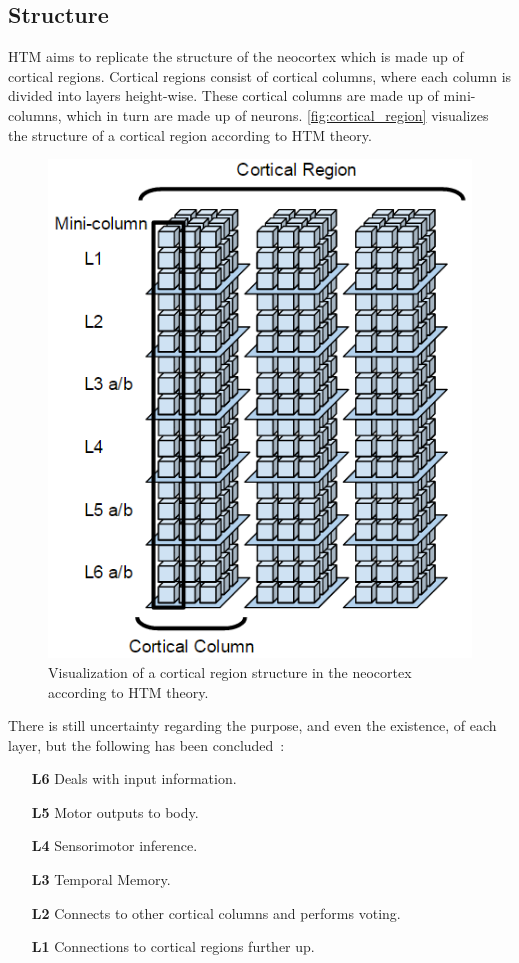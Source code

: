 \subsection{Structure}
\label{sec:htm_structure}
HTM aims to replicate the structure of the neocortex which is made up of cortical regions. Cortical regions consist of cortical columns, where each column is divided into layers height-wise. These cortical columns are made up of mini-columns, which in turn are made up of neurons. \autoref{fig:cortical_region} visualizes the structure of a cortical region according to HTM theory.
\begin{figure}[H]
    \centering
    \includegraphics[width=\textwidth]{resources/related_works/cortical_region}
    \caption[HTM Structure]{Visualization of a cortical region structure in the neocortex according to HTM theory.}
    \label{fig:cortical_region}
\end{figure}
There is still uncertainty regarding the purpose, and even the existence, of each layer, but the following has been concluded~\cite{htm_l2_l3,cortical_region}:
\begin{itemize}
    \item[\textbf{L6}] Deals with input information.
    \item[\textbf{L5}] Motor outputs to body.
    \item[\textbf{L4}] Sensorimotor inference.
    \item[\textbf{L3}] Temporal Memory.
    \item[\textbf{L2}] Connects to other cortical columns and performs voting.
    \item[\textbf{L1}] Connections to cortical regions further up.
\end{itemize}
